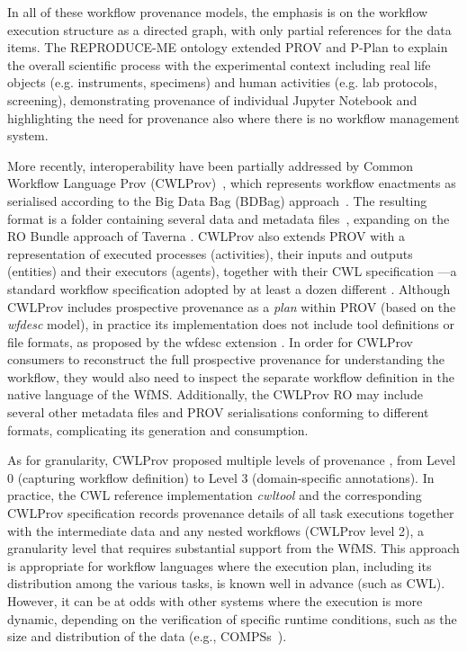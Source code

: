 In all of these workflow provenance models, the emphasis is on the workflow execution structure as a directed graph, with only partial references for the data items. 
The REPRODUCE-ME ontology \cite{Samuel 2022} extended PROV and P-Plan to explain the overall scientific process with the experimental context including real life objects (e.g. instruments, specimens) and human activities (e.g. lab protocols, screening), demonstrating provenance of individual Jupyter Notebook  and highlighting the need for provenance also where there is no workflow management system. 

More recently, interoperability have been partially addressed by Common Workflow Language Prov (CWLProv)~\cite{Khan 2019}, which represents workflow enactments as  serialised according to the Big Data Bag (BDBag) approach~\cite{Chard 2016}.
The resulting format is a folder containing several data and metadata files~\cite{Soiland-Reyes 2018}, expanding on the RO Bundle approach of Taverna \cite{Soiland-Reyes 2016}.
CWLProv also extends PROV with a representation of executed processes (activities), their inputs and outputs (entities) and their executors (agents), together with their 
\acrfull{CWL}
specification
\cite{Crusoe 2022}---a standard workflow specification adopted by at least a dozen different  . Although CWLProv includes prospective provenance as a \emph{plan}
within PROV (based on the \emph{wfdesc} model), in practice its implementation does not include tool definitions or file formats, as proposed by the wfdesc extension .
In order for CWLProv consumers to reconstruct the full prospective provenance for understanding the workflow, they would also need to inspect the separate workflow definition in the native language of the WfMS.
Additionally, the CWLProv RO may include several other metadata files and PROV serialisations conforming to different formats, complicating its generation and consumption.

As for granularity, CWLProv proposed multiple levels of provenance \cite[figure 2]{Khan 2019}, from Level 0 (capturing workflow definition) to Level 3 (domain-specific annotations). 
In practice, the CWL reference implementation \emph{cwltool} \cite{Amstutz 2023} and the corresponding CWLProv specification \cite{Soiland-Reyes 2018} records provenance details of all task executions together with the intermediate data and any nested workflows (CWLProv level 2), a granularity level that requires substantial support from the WfMS.
This approach is appropriate for workflow languages where the execution plan, including its distribution among the various tasks, is known well in advance (such as CWL).
However, it can be at odds with other systems where the execution is more dynamic, depending on the verification of specific runtime conditions, such as the size and distribution of the data (e.g., COMPSs~\cite{Lordan 2014}).

